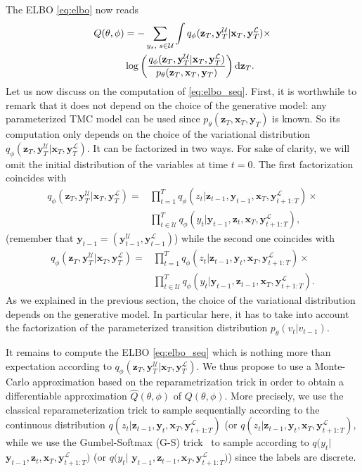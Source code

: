 \documentclass{article}
\def\x{{\mathbf x}}
\def\z{{\mathbf z}}
\def\y{{\mathbf y}}
\def\yl{{\mathbf y}_{T}^{\mathcal{L}}}
\def\yu{{\mathbf y}_{T}^{\mathcal{U}}}
\def\L{{\mathcal L}}
\def\p{p_{\theta}}
\def\q{q_\phi}
\def\L{\mathcal{L}}
\def\U{\mathcal{U}}
\begin{document}
The ELBO \eqref{eq:elbo} now reads
\begin{align}
\label{eq:elbo_seq}
Q(\theta,\phi)&=  -  \sum_{y_s \text{, }  s \in \U} \int  \q(\z_T, \yu|\x_T, \yl) \times \nonumber \\  & \log \left(\frac{\q(\z_T,\yu  |\x_T,\yl)}{\p(\z_T,\x_T, \y_T)}\right)  {\rm d} \z_T \text{.}
\end{align}
\label{eq:TMC}
Let us now discuss on the 
computation of 
\eqref{eq:elbo_seq}.
First, it is worthwhile to remark 
that it does not depend on the choice of the generative model: 
any parameterized TMC model can be used since 
$ \p(\z_T,\x_T, \y_T)$ is known.
So its computation only depends
on the choice of the variational
distribution $\q(\z_T, \yu|\x_T, \yl)$. It can be factorized in two ways.
For sake of clarity, we will omit
the initial distribution of the variables at time $t=0$.
The first factorization 
coincides with 
\begin{align}
\label{eq:fact-1}
\q(\z_T, \yu|\x_T, \yl)=& \prod_{t=1}^T  \q(z_t|\z_{t-1},\y_{t-1},\x_T,\y_{t+1:T}^{\L}) \times \nonumber \\ & \prod_{t \in \U }^T 
\q(y_t|\y_{t-1},\z_t,\x_T,\y_{t+1:T}^{\L}) \text{,}
\end{align}
(remember that $\y_{t-1}=(\y_{t-1}^{\U},\y_{t-1}^{\L})$)
while the second one coincides
with 
\begin{align}
\label{eq:fact-2}
\q(\z_T, \yu|\x_T, \yl)=& \prod_{t=1}^T  \q(z_t|\z_{t-1},\y_{t},\x_T,\y_{t+1:T}^{\L}) \times \nonumber \\ & \! \! \prod_{t \in \U }^T 
\q(y_t|\y_{t-1},\z_{t-1},\x_T,\y_{t+1:T}^{\L}) \text{.}
\end{align}
As we explained in the previous section, the choice of the variational distribution depends on the generative model. In particular here, it has to take into account the factorization of the parameterized transition distribution $\p(v_t|v_{t-1})$.

It remains to compute the ELBO \eqref{eq:elbo_seq} which is nothing more than expectation according to $\q(\z_T, \yu|\x_T, \yl)$.
We thus propose to use a Monte-Carlo approximation based on the reparametrization trick in order
to obtain a differentiable approximation $\hat{Q}(\theta,\phi)$ of $Q(\theta,\phi)$. 
More precisely, we use the classical reparameterization trick to sample sequentially according to the continuous distribution $ q(z_t|\z_{t-1},\y_{t},\x_T,\y_{t+1:T}^{\L})$ (or 
 $q(z_t|\z_{t-1},\y_{t},\x_T,\y_{t+1:T}^{\L})$, while
 we use the Gumbel-Softmax (G-S) 
trick~\cite{maddison2016concrete, jang2016categorical} to sample according to $q(y_t|$ $\y_{t-1},\z_t,\x_T,\y_{t+1:T}^{\L})$ (or
$q(y_t|$ $\y_{t-1},\z_{t-1},\x_T,\y_{t+1:T}^{\L})$) since
the labels are discrete.
\end{document}
